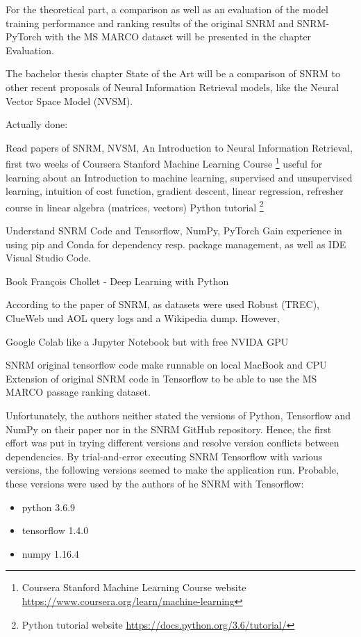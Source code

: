 For the theoretical part, a comparison as well as an evaluation of the model training performance and ranking results of the original SNRM and SNRM-PyTorch with the MS MARCO dataset will be presented in the chapter Evaluation.

The bachelor thesis chapter State of the Art will be a comparison of SNRM to other recent proposals of Neural Information Retrieval models, like the Neural Vector Space Model (NVSM).



Actually done:

Read papers of SNRM, NVSM, An Introduction to Neural Information Retrieval,
first two weeks of Coursera Stanford Machine Learning Course \footnote{Coursera Stanford Machine Learning Course website \url{https://www.coursera.org/learn/machine-learning}}
useful for learning about an Introduction to machine learning, supervised and unsupervised learning, intuition of
cost function, gradient descent, linear regression, refresher course in linear algebra (matrices, vectors)
Python tutorial \footnote{Python tutorial website \url{https://docs.python.org/3.6/tutorial/}}

Understand SNRM Code and Tensorflow, NumPy, PyTorch
Gain experience in using pip and Conda for dependency resp. package management, as well as IDE Visual Studio Code.


Book François Chollet - Deep Learning with Python

According to the paper of SNRM, as datasets were used Robust (TREC), ClueWeb und AOL query logs and a Wikipedia dump.
However, 


Google Colab like a Jupyter Notebook but with free NVIDA GPU

SNRM original tensorflow code make runnable on local MacBook and CPU
Extension of original SNRM code in Tensorflow to be able to use the MS MARCO passage ranking dataset.

Unfortunately, the authors neither stated the versions of Python, Tensorflow and NumPy on their paper nor in the SNRM GitHub repository.
Hence, the first effort was put in trying different versions and resolve version conflicts between dependencies.
By trial-and-error executing SNRM Tensorflow with various versions, the following versions seemed to make the application run.
Probable, these versions were used by the authors of he SNRM with Tensorflow:

\begin{itemize}
    \item python 3.6.9
    \item tensorflow 1.4.0
    \item numpy 1.16.4
\end{itemize}

